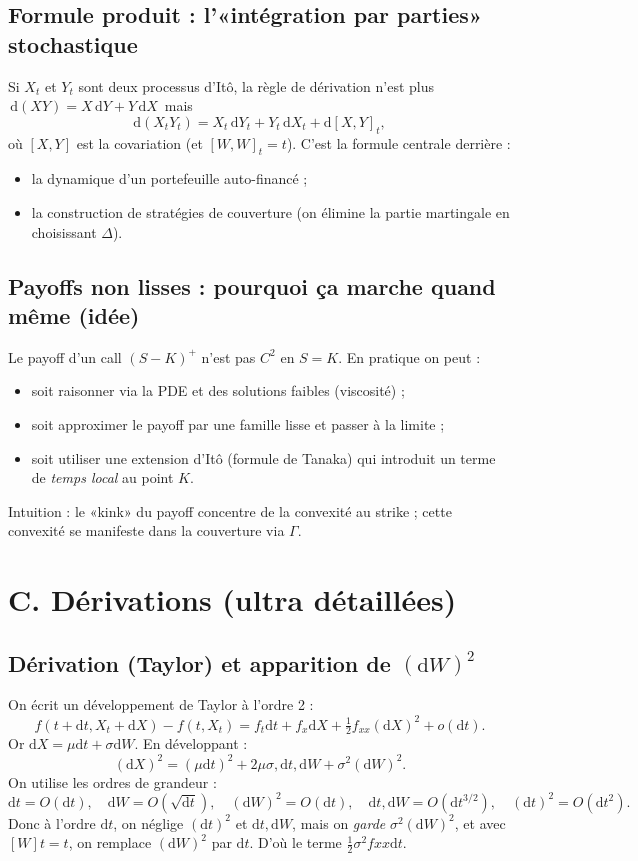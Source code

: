 \documentclass[11pt,a4paper]{report}
\theoremstyle{definition}
\theoremstyle{plain}
\theoremstyle{remark}
\newcommand{\dd}{\mathrm{d}}
\newcommand{\1}{\mathbf{1}}
\begin{document}
\subsection*{Formule produit : l'«intégration par parties» stochastique}
Si $X_t$ et $Y_t$ sont deux processus d'Itô, la règle de dérivation n'est plus $\,\dd(XY)=X\,\dd Y + Y\,\dd X\,$ mais
\[
\dd(X_tY_t)=X_t\,\dd Y_t + Y_t\,\dd X_t + \dd[X,Y]_t,
\]
où $[X,Y]$ est la covariation (et $[W,W]_t=t$).
C'est la formule centrale derrière :
\begin{itemize}[leftmargin=*]
\item la dynamique d'un portefeuille auto-financé ;
\item la construction de stratégies de couverture (on élimine la partie martingale en choisissant $\Delta$).
\end{itemize}

\subsection*{Payoffs non lisses : pourquoi ça marche quand même (idée)}
Le payoff d'un call $(S-K)^+$ n'est pas $C^2$ en $S=K$. En pratique on peut :
\begin{itemize}[leftmargin=*]
\item soit raisonner via la PDE et des solutions faibles (viscosité) ;
\item soit approximer le payoff par une famille lisse et passer à la limite ;
\item soit utiliser une extension d'Itô (formule de Tanaka) qui introduit un terme de \emph{temps local} au point $K$.
\end{itemize}
Intuition : le «kink» du payoff concentre de la convexité au strike ; cette convexité se manifeste dans la couverture via $\Gamma$.



\section{C. Dérivations (ultra détaillées)}
\subsection*{Dérivation (Taylor) et apparition de $(\dd W)^2$}
On écrit un développement de Taylor à l'ordre 2 :
\[
f(t+\dd t, X_t+\dd X)-f(t,X_t)
= f_t\dd t + f_x\dd X + \tfrac12 f_{xx}(\dd X)^2 + o(\dd t).
\]
Or $\dd X=\mu \dd t+\sigma \dd W$. En développant :
\[
(\dd X)^2 = (\mu \dd t)^2 + 2\mu\sigma,\dd t,\dd W + \sigma^2 (\dd W)^2.
\]
On utilise les ordres de grandeur :
\[
\dd t = O(\dd t),\quad \dd W = O(\sqrt{\dd t}),\quad (\dd W)^2=O(\dd t),\quad \dd t,\dd W=O(\dd t^{3/2}),\quad (\dd t)^2=O(\dd t^2).
\]
Donc à l'ordre $\dd t$, on néglige $(\dd t)^2$ et $\dd t,\dd W$, mais on \emph{garde} $\sigma^2(\dd W)^2$, et avec $[W]t=t$, on remplace $(\dd W)^2$ par $\dd t$. D'où le terme $\tfrac12\sigma^2 f{xx}\dd t$.
\end{document}
